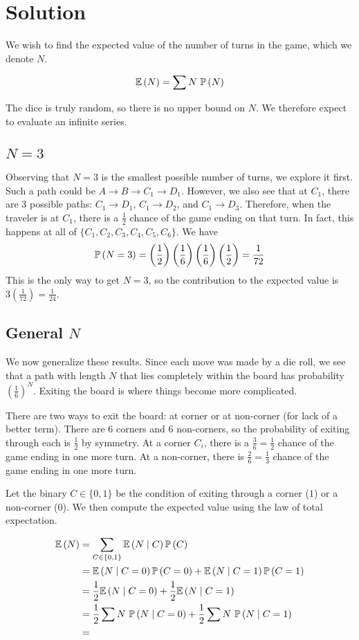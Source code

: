 \documentclass[11pt]{article}
\begin{document}
\section{Solution}
We wish to find the expected value of the number of turns in the game, which we denote $N$.

\[
    \E{N} = \sum N\ \P{N}
\]

The dice is truly random, so there is no upper bound on $N$.
We therefore expect to evaluate an infinite series.

\subsection{$N=3$}
Observing that $N=3$ is the smallest possible number of turns, we explore it first.
Such a path could be $A \to B \to C_1 \to D_1$.
However, we also see that at $C_1$, there are 3 possible paths: $C_1 \to D_1$, $C_1 \to D_2$, and $C_1 \to D_3$.
Therefore, when the traveler is at $C_1$, there is a $\frac{1}{2}$ chance of the game ending on that turn.
In fact, this happens at all of $\{ C_1, C_2, C_3, C_4, C_5, C_6 \}$.
We have
\[
    \P{N=3} = \left ( \frac{1}{2} \right)\left (\frac{1}{6} \right) \left (\frac{1}{6} \right) \left (\frac{1}{2} \right) = \frac{1}{72}
\]
This is the only way to get $N=3$, so the contribution to the expected value is $3 \left ( \frac{1}{72} \right) = \frac{1}{24}$.

\subsection{General $N$}
We now generalize these results.
Since each move was made by a die roll, we see that a path with length $N$ that lies completely within the board has probability $\left (\frac{1}{6} \right)^N$.
Exiting the board is where things become more complicated.

There are two ways to exit the board: at corner or at non-corner (for lack of a better term).
There are 6 corners and 6 non-corners, so the probability of exiting through each is $\frac{1}{2}$ by symmetry.
At a corner $C_i$, there is a $\frac{3}{6} = \frac{1}{2}$ chance of the game ending in one more turn.
At a non-corner, there is $\frac{2}{6} = \frac{1}{3}$ chance of the game ending in one more turn.

Let the binary $C \in \{0, 1 \}$ be the condition of exiting through a corner ($1$) or a non-corner ($0$).
We then compute the expected value using the law of total expectation.

\begin{align*}
    \E{N} &= \sum \limits_{C \in \{0, 1 \}} \E{N \mid C} \P{C} \\ 
    &= \E{N \mid C = 0} \P{C=0} + \E{N \mid C = 1} \P{C = 1} \\
    &= \frac{1}{2} \E{N \mid C = 0} + \frac{1}{2} \E{N \mid C = 1} \\
    &= \frac{1}{2} \sum N\ \P{N \mid C = 0} + \frac{1}{2} \sum N\ \P{N \mid C = 1} \\
    &= 
\end{align*}
\end{document}

